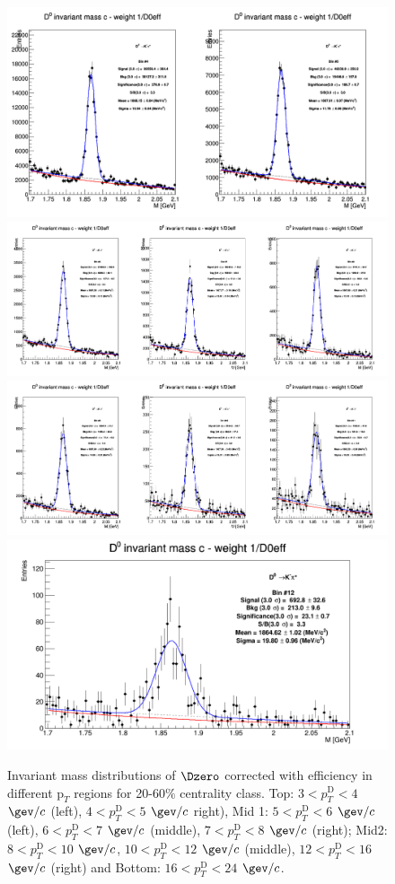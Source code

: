 \begin{figure}[!htp]
\centering

{\includegraphics[width=0.7\linewidth]{figuresVsCent/Dzero/MassPlots/2060/InvMassDistributions_Dzero_Bins4to5.png}}
{\includegraphics[width=0.9\linewidth]{figuresVsCent/Dzero/MassPlots/2060/InvMassDistributions_Dzero_Bins6to8.png}}
{\includegraphics[width=0.9\linewidth]{figuresVsCent/Dzero/MassPlots/2060/InvMassDistributions_Dzero_Bins9to11.png}}
{\includegraphics[width=0.6\linewidth]{figuresVsCent/Dzero/MassPlots/2060/InvMassDistributions_Dzero_Bins12to12.png}}

\caption{Invariant mass distributions of $\Dzero$ corrected with efficiency in different $\text{p}_T$ regions for 20-60$\%$ centrality class. Top: $3< p_{T}^{\text{D}}< 4$ $\gev/c$ (left), $4< p_{T}^{\text{D}}< 5$ $\gev/c$ right), Mid 1: $5< p_{T}^{\text{D}}< 6$ $\gev/c$ (left), $6 < p_{T}^{\text{D}} < 7$ $\gev/c$ (middle), $7< p_{T}^{\text{D}}< 8$ $\gev/c$ (right); Mid2: $8< p_{T}^{\text{D}}< 10$ $\gev/c$, $10< p_{T}^{\text{D}}< 12$ $\gev/c$  (middle), $12 < p_{T}^{\text{D}}< 16$ $\gev/c$  (right) and Bottom: $16<p_{T}^{\text{D}}< 24$ $\gev/c$.}
\label{fig:InvMassD02060}
\end{figure}

